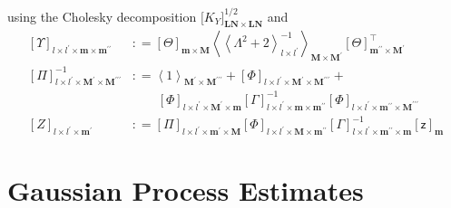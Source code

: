 \documentclass[preprint,12pt]{elsarticle}
\newcommand*{\M}[1]{\ensuremath{#1}\xspace}
\newcommand*{\x}{\times}
\newcommand*{\mi}[1]{\mathbf{#1}}
\newcommand*{\rv}[1]{\mathsf{#1}}
\newcommand*{\te}[2][]{\left\lbrack{#2}\right\rbrack_{#1}}
\newcommand*{\tte}[2][]{\lbrack{#2}\rbrack_{#1}}
\newcommand*{\diag}[2][]{\left\langle{#2}\right\rangle_{#1}}
\newcommand*{\deq}{\M{\mathrel{\mathop:}=}}
\begin{document}
            using the Cholesky decomposition $\tte[\mi{LN}\x\mi{LN}]{K_{Y}}^{1/2}$ and
            \begin{equation*}
                \begin{aligned}
                    \te[l\x l^{\prime}\x\mi{m}\x\mi{m^{\prime\prime}}]{\Upsilon} &\deq \te[\mi{m}\x\mi{M}]{\Theta}
                    \diag[\mi{M}\x\mi{M^{\prime}}]{\diag[l\x l^{\prime}]{\Lambda^{2}+2}^{-1}} \te[\mi{m^{\prime\prime}}\x\mi{M^{\prime}}]{\Theta}^{\intercal} \\
                    \te[l\x l^{\prime}\x \mi{M^{\prime}}\x\mi{M^{\prime\prime\prime}}]{\Pi}^{-1} &\deq 
                    \diag[\mi{M^{\prime}}\x\mi{M^{\prime\prime\prime}}]{1} + \te[l\x l^{\prime}\x \mi{M^{\prime}}\x\mi{M^{\prime\prime\prime}}]{\Phi} + \\
                    &\phantom{\deq}\ \te[l\x l^{\prime}\x\mi{M^{\prime}\x\mi{m}}]{\Phi}
                    \te[l\x l^{\prime}\x\mi{m}\x\mi{m^{\prime\prime}}]{\Gamma}^{-1} \te[l\x l^{\prime}\x\mi{m^{\prime\prime}}\x\mi{M^{\prime\prime\prime}}]{\Phi} \\
                    \te[l\x l^{\prime}\x \mi{m^{\prime}}]{Z} &\deq 
                    \te[l\x l^{\prime}\x \mi{m^{\prime}}\x\mi{M}]{\Pi}
                    \te[l\x l^{\prime}\x\mi{M}\x\mi{m^{\prime\prime}}]{\Phi}
                    \te[l\x l^{\prime}\x\mi{m^{\prime\prime}}\x\mi{m}]{\Gamma}^{-1}
                    \te[\mi{m}]{\rv{z}}
                \end{aligned}
            \end{equation*}


\section{Gaussian Process Estimates}\label{sec:GPEst}
\end{document}

